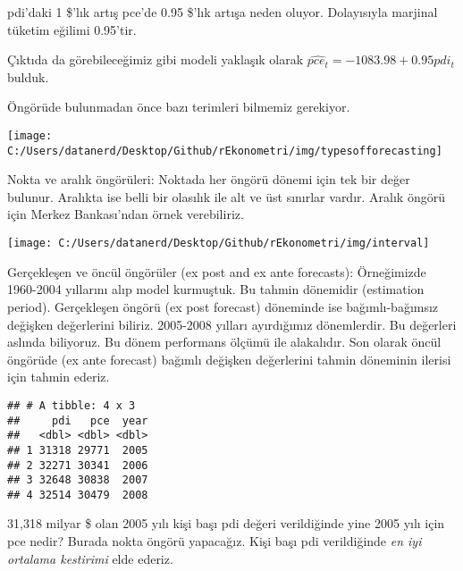 \documentclass[
]{book}
\newenvironment{Shaded}{\begin{snugshade}}{\end{snugshade}}
\newcommand{\DecValTok}[1]{\textcolor[rgb]{0.00,0.00,0.81}{#1}}
\newcommand{\KeywordTok}[1]{\textcolor[rgb]{0.13,0.29,0.53}{\textbf{#1}}}
\newcommand{\NormalTok}[1]{#1}
\newcommand{\OperatorTok}[1]{\textcolor[rgb]{0.81,0.36,0.00}{\textbf{#1}}}
\newcommand{\StringTok}[1]{\textcolor[rgb]{0.31,0.60,0.02}{#1}}
\begin{document}
pdi'daki 1 \$'lık artış pce'de 0.95 \$'lık artışa neden oluyor. Dolayısıyla marjinal tüketim eğilimi 0.95'tir.

Çıktıda da görebileceğimiz gibi modeli yaklaşık olarak \(\hat{pce_t} = -1083.98 + 0.95pdi_t\) bulduk.

Öngörüde bulunmadan önce bazı terimleri bilmemiz gerekiyor.

\texttt{[image: C:/Users/datanerd/Desktop/Github/rEkonometri/img/typesofforecasting]}

Nokta ve aralık öngörüleri: Noktada her öngörü dönemi için tek bir değer bulunur. Aralıkta ise belli bir olasılık ile alt ve üst sınırlar vardır. Aralık öngörü için Merkez Bankası'ndan örnek verebiliriz.

\texttt{[image: C:/Users/datanerd/Desktop/Github/rEkonometri/img/interval]}

Gerçekleşen ve öncül öngörüler (ex post and ex ante forecasts): Örneğimizde 1960-2004 yıllarını alıp model kurmuştuk. Bu tahmin dönemidir (estimation period). Gerçekleşen öngörü (ex post forecast) döneminde ise bağımlı-bağımsız değişken değerlerini biliriz. 2005-2008 yılları ayırdığımız dönemlerdir. Bu değerleri aslında biliyoruz. Bu dönem performans ölçümü ile alakalıdır. Son olarak öncül öngörüde (ex ante forecast) bağımlı değişken değerlerini tahmin döneminin ilerisi için tahmin ederiz.

\begin{Shaded}
\end{Shaded}

\begin{verbatim}
## # A tibble: 4 x 3
##     pdi   pce  year
##   <dbl> <dbl> <dbl>
## 1 31318 29771  2005
## 2 32271 30341  2006
## 3 32648 30838  2007
## 4 32514 30479  2008
\end{verbatim}

31,318 milyar \$ olan 2005 yılı kişi başı pdi değeri verildiğinde yine 2005 yılı için pce nedir? Burada nokta öngörü yapacağız. Kişi başı pdi verildiğinde \emph{en iyi ortalama kestirimi} elde ederiz.
\end{document}
